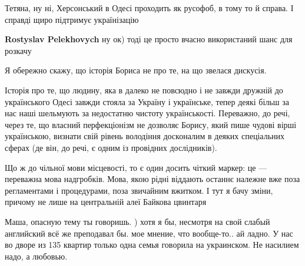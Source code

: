 \begin{itemize}
\begin{itemize}
Тетяна, ну ні, Херсонський в Одесі проходить як русофоб, в тому то й справа. І справді щиро підтримує українізацію

 
\textbf{Rostyslav Pelekhovych} ну ок) тоді це просто вчасно використаний шанс для розкачу
\end{itemize}

 

Я обережно скажу, що історія Бориса не про те, на що звелася дискусія.

Історія про те, що людину, яка в далеко не повсюдно і не завжди дружній до
українського Одесі завжди стояла за Україну і українське, тепер деякі більш за
нас наші шельмують за недостатню чистоту українськості. Переважно, до речі,
через те, що власний перфекціонізм не дозволяє Борису, який пише чудові вірші
українською, визнати свій рівень володіння досконалим в деяких спеціальних
сферах (де він, до речі, є одним із провідних дослідників).

Що ж до чільної мови місцевості, то є один досить чіткий маркер: це — переважна
мова надгробків. Мова, якою рідні віддають останнє належне вже поза
регламентами і процедурами, поза звичайним вжитком. І тут я бачу зміни, причому
не лише на центральній алеї Байкова цвинтаря

 

Маша, опасную тему ты говоришь. ) хотя я бы, несмотря на свой слабый английский
всё же преподавал бы. мое мнение, что вообще-то.. ай ладно. У нас во дворе из
135 квартир только одна семья говорила на украинском. Не насилием надо, а
любовью.


 


\end{itemize}
